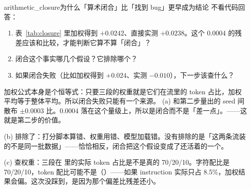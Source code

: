 \begin{checkpoint}{arithmetic_closure}{为什么「算术闭合」比「找到 bug」更早成为结论}
不看代码回答：
\begin{enumerate}[label=(\alph*)]
  \item 表~\ref{tab:closure} 里加权得到 $+0.0242$、直接实测 $+0.0238$。这个 $0.0004$ 的残差应该和比较，才能判断它算不算「闭合」？
  \item 闭合这个事实哪几个假设？它排除哪个？
  \item 如果闭合失败（比如加权得到 $+0.024$、实测 $-0.010$），下一步该查什么？
\end{enumerate}
\hint 加权公式本身是个恒等式：只要三段的权重就是它们在流里的 token 占比，加权平均等于整体平均。所以闭合失败只能有一个来源。
\ifshowanswers
\tcblower
\answer (a) 和第二步量出的 seed 间散布 $\pm0.0003$ 比。$0.0004$ 落在这个量级上，所以是闭合而不是「差一点」。——这就是第二步的价值。

(b) 排除了：打分脚本算错、权重用错、模型加载错。没有排除的是「这两条流装的不是同一批数据」——恰恰相反，闭合把这个假设变成了还活着的一个。

(c) 查权重：三段在  里的实际 token 占比是不是真的 70/20/10。字符配比是 70/20/10，token 配比可能不是（）——如果 instruction 实际只占 8.5\%，加权结果会偏。这次没踩到，是因为那个偏差比残差还小。
\whereincode {}
\fi
\end{checkpoint}

